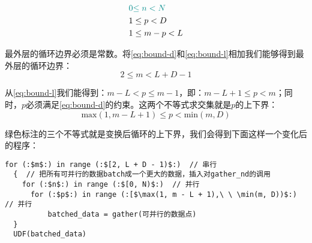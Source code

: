 \begin{align}
\textcolor{dkgreen}{0} &\textcolor{dkgreen}{\le n < N} \\
1 &\le p < D  \label{eq:bound-d}\\
1 &\le m - p < L \label{eq:bound-l}
\end{align}

最外层的循环边界必须是常数。将\eqref{eq:bound-d}和\eqref{eq:bound-l}相加我们能够得到最外层的循环边界：
\textcolor{dkgreen}{$$2 \le m < L + D -1$$}

从\eqref{eq:bound-l}我们能得到：$m - L < p \le m -1$，即：$m -L+1 \le p < m$；同时，$p$必须满足\eqref{eq:bound-d}的约束。这两个不等式求交集就是$p$的上下界：
\textcolor{dkgreen}{$$\text{max}(1, m -L+1) \le p < \text{min}(m, D)$$}

\textcolor{dkgreen}{绿色}标注的三个不等式就是变换后循环的上下界，我们会得到下面这样一个变化后的程序：
\begin{lstlisting}[language=cplus]
for (:$m$:) in range (:$[2, L + D - 1)$:)  // 串行
  {  // 把所有可并行的数据batch成一个更大的数据，插入对gather_nd的调用
    for (:$n$:) in range (:$[0, N)$:)  // 并行
      for (:$p$:) in range (:[$\max(1, m - L + 1),\ \ \min(m, D))$:) // 并行
          batched_data = gather(可并行的数据点)
  }
  UDF(batched_data)
\end{lstlisting}
